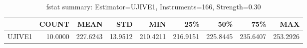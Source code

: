 \begin{table}[ht]
\centering
\caption{fstat summary: Estimator=UJIVE1, Instruments=166, Strength=0.30}
\begin{tabular}{lrrrrrrrr}
\toprule
 & COUNT & MEAN & STD & MIN & 25\% & 50\% & 75\% & MAX \\
\midrule
UJIVE1 & 10.0000 & 227.6243 & 13.9512 & 210.4211 & 216.9151 & 225.8445 & 235.6407 & 253.2926 \\
\bottomrule
\end{tabular}
\end{table}
